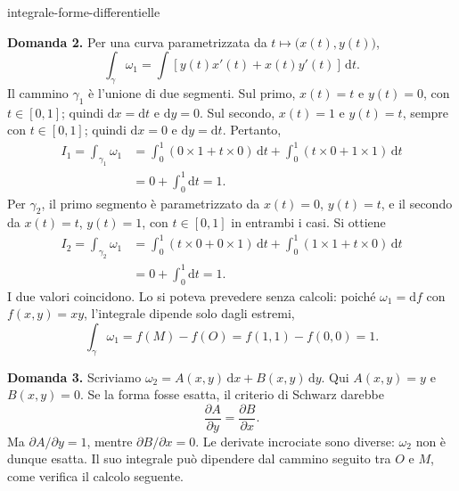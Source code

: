 \begin{exo}{integrale-forme-differentielle}
\begin{solution}
\textbf{Domanda 2.} Per una curva parametrizzata da $t\mapsto\bigl(x(t),y(t)\bigr)$,
\[\int_\gamma\omega_1=\int\left[y(t)x'(t)+x(t)y'(t)\right]\,\mathrm{d}t.\]
Il cammino $\gamma_1$ è l'unione di due segmenti. Sul primo, $x(t)=t$ e
$y(t)=0$, con $t\in[0,1]$; quindi $\mathrm{d}x=\mathrm{d}t$ e $\mathrm{d}y=0$.
Sul secondo, $x(t)=1$ e $y(t)=t$, sempre con $t\in[0,1]$; quindi
$\mathrm{d}x=0$ e $\mathrm{d}y=\mathrm{d}t$. Pertanto,
\[\begin{aligned}I_1=\int_{\gamma_1}\omega_1&=\int_0^1(0\times1+t\times0)\,\mathrm{d}t+\int_0^1(t\times0+1\times1)\,\mathrm{d}t\\&=0+\int_0^1\mathrm{d}t=1.\end{aligned}\]
Per $\gamma_2$, il primo segmento è parametrizzato da $x(t)=0$, $y(t)=t$,
e il secondo da $x(t)=t$, $y(t)=1$, con $t\in[0,1]$ in entrambi i casi. Si ottiene
\[\begin{aligned}I_2=\int_{\gamma_2}\omega_1&=\int_0^1(t\times0+0\times1)\,\mathrm{d}t+\int_0^1(1\times1+t\times0)\,\mathrm{d}t\\&=0+\int_0^1\mathrm{d}t=1.\end{aligned}\]
I due valori coincidono. Lo si poteva prevedere senza calcoli: poiché
$\omega_1=\mathrm{d}f$ con $f(x,y)=xy$, l'integrale dipende solo dagli estremi,
\[\int_\gamma\omega_1=f(M)-f(O)=f(1,1)-f(0,0)=1.\]

\textbf{Domanda 3.} Scriviamo $\omega_2=A(x,y)\,\mathrm{d}x+B(x,y)\,\mathrm{d}y$.
Qui $A(x,y)=y$ e $B(x,y)=0$. Se la forma fosse esatta, il criterio di Schwarz darebbe
\[\frac{\partial A}{\partial y}=\frac{\partial B}{\partial x}.\]
Ma $\partial A/\partial y=1$, mentre $\partial B/\partial x=0$. Le derivate
incrociate sono diverse: $\omega_2$ non è dunque esatta. Il suo integrale può
dipendere dal cammino seguito tra $O$ e $M$, come verifica il calcolo seguente.


\end{solution}
\end{exo}

